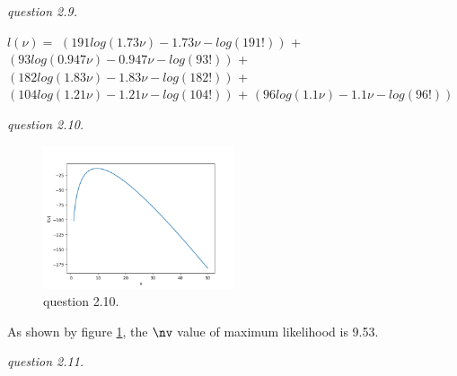 \documentclass{article}
\begin{document}
\vspace{\baselineskip}
\textit{question 2.9.}

$l(\nu)=$
$(191log(1.73\nu) - 1.73\nu - log(191!))$ + 
$(93log(0.947\nu) - 0.947\nu - log(93!))$ +
$(182log(1.83\nu) - 1.83\nu - log(182!))$ +
$(104log(1.21\nu) - 1.21\nu - log(104!))$ +
$(96log(1.1\nu) - 1.1\nu - log(96!))$

\vspace{\baselineskip}
\textit{question 2.10.}

\begin{figure}[h!]
    \centering
    \includegraphics[width=0.5\textwidth]{2-10}
    \caption{question 2.10.}
    \label{fig:2-10}
\end{figure}
As shown by figure \ref{fig:2-10}, the $\nv$ value of maximum likelihood is 9.53.

\vspace{\baselineskip}
\textit{question 2.11.}
\end{document}
